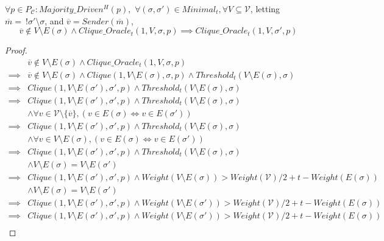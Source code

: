 \begin{lemma}
  $\forall p \in P_{\mathcal{C}} : Majority\_Driven^H(p),$ $\forall (\sigma, \sigma') \in Minimal_t, \forall V \subseteq \mathcal{V}$, letting $\overline{m} = ~ !\sigma'\setminus\sigma$, and $\overline{v} = Sender(\overline{m})$,
  $$
  \overline{v} \notin V \setminus E(\sigma) \land Clique\_Oracle_t(1, V, \sigma, p) \implies Clique\_Oracle_t(1, V, \sigma', p)
  $$
\end{lemma}

\begin{proof}
\begin{align}
          &\overline{v} \notin V \setminus E(\sigma) \land Clique\_Oracle_t(1, V, \sigma, p) \\
  \implies&\overline{v} \notin V \setminus E(\sigma) \land Clique(1, V \setminus E(\sigma), \sigma, p) \land Threshold_t(V \setminus E(\sigma), \sigma) \\
  \implies&Clique(1, V \setminus E(\sigma'), \sigma', p) \land Threshold_t(V \setminus E(\sigma), \sigma) \\
  \implies&Clique(1, V \setminus E(\sigma'), \sigma', p) \land Threshold_t(V \setminus E(\sigma), \sigma) \\
          &\land \forall v \in \mathcal{V} \setminus \{\overline{v}\}, (v \in E(\sigma) \iff v \in E(\sigma')) \\
  \implies&Clique(1, V \setminus E(\sigma'), \sigma', p) \land Threshold_t(V \setminus E(\sigma), \sigma) \\
          &\land \forall v \in V \setminus E(\sigma), (v \in E(\sigma) \iff v \in E(\sigma')) \\
  \implies&Clique(1, V \setminus E(\sigma'), \sigma', p) \land Threshold_t(V \setminus E(\sigma), \sigma) \\
          &\land V \setminus E(\sigma) = V \setminus E(\sigma') \\
  \implies&Clique(1, V \setminus E(\sigma'), \sigma', p) \land Weight(V \setminus E(\sigma)) > Weight(\mathcal{V})/2 + t - Weight(E(\sigma)) \\
          &\land V \setminus E(\sigma) = V \setminus E(\sigma') \\
  \implies&Clique(1, V \setminus E(\sigma'), \sigma', p) \land Weight(V \setminus E(\sigma')) > Weight(\mathcal{V})/2 + t - Weight(E(\sigma)) \\
  \implies&Clique(1, V \setminus E(\sigma'), \sigma', p) \land Weight(V \setminus E(\sigma')) > Weight(\mathcal{V})/2 + t - Weight(E(\sigma)) \\

\end{align}
\end{proof}
